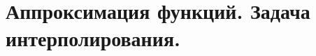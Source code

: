 \documentclass[../../calc-math-exam-2023.tex]{subfiles}
\begin{document}
    \section{Аппроксимация функций. Задача интерполирования.}\label{sec:ch05}
\end{document}
